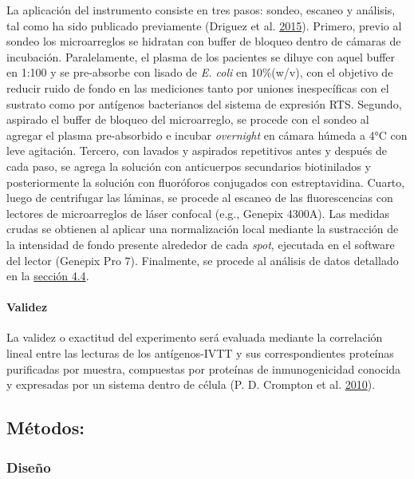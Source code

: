 \documentclass[a4paper]{article}
\let\oldparagraph\paragraph
\renewcommand{\paragraph}[1]{\oldparagraph{#1}\mbox{}}
\begin{document}
La aplicación del instrumento consiste en tres pasos: sondeo, escaneo y
análisis, tal como ha sido publicado previamente (Driguez et al.
\protect\hyperlink{ref-Driguez2015}{2015}). Primero, previo al sondeo
los microarreglos se hidratan con buffer de bloqueo dentro de cámaras de
incubación. Paralelamente, el plasma de los pacientes se diluye con
aquel buffer en 1:100 y se pre-absorbe con lisado de \emph{E. coli} en
10\%(w/v), con el objetivo de reducir ruido de fondo en las mediciones
tanto por uniones inespecíficas con el sustrato como por antígenos
bacterianos del sistema de expresión RTS. Segundo, aspirado el buffer de
bloqueo del microarreglo, se procede con el sondeo al agregar el plasma
pre-absorbido e incubar \emph{overnight} en cámara húmeda a 4°C con leve
agitación. Tercero, con lavados y aspirados repetitivos antes y después
de cada paso, se agrega la solución con anticuerpos secundarios
biotinilados y posteriormente la solución con fluoróforos conjugados con
estreptavidina. Cuarto, luego de centrifugar las láminas, se procede al
escaneo de las fluorescencias con lectores de microarreglos de láser
confocal (e.g., Genepix 4300A). Las medidas crudas se obtienen al
aplicar una normalización local mediante la sustracción de la intensidad
de fondo presente alrededor de cada \emph{spot}, ejecutada en el
software del lector (Genepix Pro 7). Finalmente, se procede al análisis
de datos detallado en la \protect\hyperlink{anadata}{sección 4.4}.

\hypertarget{validez}{\paragraph{Validez}\label{validez}}

La validez o exactitud del experimento será evaluada mediante la
correlación lineal entre las lecturas de los antígenos-IVTT y sus
correspondientes proteínas purificadas por muestra, compuestas por
proteínas de inmunogenicidad conocida y expresadas por un sistema dentro
de célula (P. D. Crompton et al.
\protect\hyperlink{ref-crompton2010}{2010}).

\subsection{Métodos:}\label{metodos}

\subsubsection{Diseño}\label{diseno}
\end{document}
